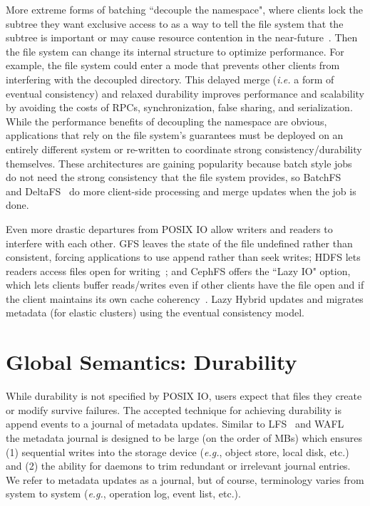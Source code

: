 More extreme forms of batching ``decouple the namespace", where clients lock
the subtree they want exclusive access to as a way to tell the file system that
the subtree is important or may cause resource contention in the
near-future~\cite{grider:pdsw2015-marfs, zheng:pdsw2015-deltafs,
zheng:pdsw2014-batchfs, ren:sc2014-indexfs, bent:slides-twotiers}. Then the
file system can change its internal structure to optimize performance. For
example, the file system could enter a mode that prevents other clients from
interfering with the decoupled directory.  This delayed merge ({\it i.e.} a
form of eventual consistency) and relaxed durability improves performance and
scalability by avoiding the costs of RPCs, synchronization, false sharing, and
serialization.  While the performance benefits of decoupling the namespace are
obvious, applications that rely on the file system's guarantees must be
deployed on an entirely different system or re-written to coordinate strong
consistency/durability themselves.  These architectures are gaining popularity
because batch style jobs do not need the strong consistency that the file
system provides, so BatchFS~\cite{zheng:pdsw2014-batchfs} and
DeltaFS~\cite{zheng:pdsw2015-deltafs} do more client-side processing and merge
updates when the job is done.  

Even more drastic departures from POSIX IO allow writers and readers to
interfere with each other. GFS leaves the state of the file undefined rather
than consistent, forcing applications to use append rather than seek writes;
HDFS lets readers access files open for
writing~\cite{hakimzadeh:dais14-hdfs-consistency}; and CephFS offers the ``Lazy
IO" option, which lets clients buffer reads/writes even if other clients have
the file open and if the client maintains its own cache
coherency~\cite{docs:cephcaps}.  Lazy Hybrid updates and migrates metadata (for
elastic clusters) using the eventual consistency model.

\section{Global Semantics: Durability}

While durability is not specified by POSIX IO, users expect that files they
create or modify survive failures. The accepted technique for achieving
durability is append events to a journal of metadata updates.  Similar to
LFS~\cite{rosenblum:acm1992-LFS} and WAFL~\cite{hitz:wtec1994-WAFL} the
metadata journal is designed to be large (on the order of MBs) which ensures
(1) sequential writes into the storage device ({\it e.g.}, object store, local
disk, etc.) and (2) the ability for daemons to trim redundant or irrelevant
journal entries. We refer to metadata updates as a journal, but of course,
terminology varies from system to system ({\it e.g.}, operation log, event
list, etc.). 

